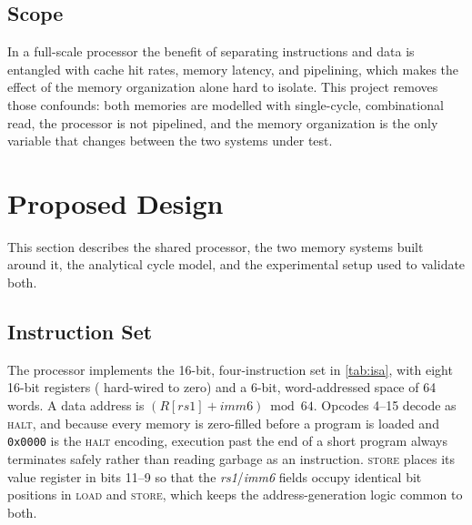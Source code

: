 \documentclass[conference]{IEEEtran}
\newcommand{\sig}[1]{\texttt{\detokenize{#1}}}
\begin{document}
\subsection{Scope}
In a full-scale processor the benefit of separating instructions and data is entangled with cache
hit rates, memory latency, and pipelining, which makes the effect of the memory organization alone
hard to isolate. This project removes those confounds: both memories are modelled with
single-cycle, combinational read, the processor is not pipelined, and the memory organization is
the only variable that changes between the two systems under test.

\section{Proposed Design}
\label{sec:design}

This section describes the shared processor, the two memory systems built around it, the
analytical cycle model, and the experimental setup used to validate both.

\subsection{Instruction Set}
The processor implements the 16-bit, four-instruction set in \cref{tab:isa}, with eight 16-bit
registers (\sig{R0} hard-wired to zero) and a 6-bit, word-addressed space of 64 words. A data
address is $(R[\mathit{rs1}] + \mathit{imm6}) \bmod 64$. Opcodes 4--15 decode as \textsc{halt}, and
because every memory is zero-filled before a program is loaded and \texttt{0x0000} is the
\textsc{halt} encoding, execution past the end of a short program always terminates safely rather
than reading garbage as an instruction. \textsc{store} places its value register in bits 11--9 so
that the \emph{rs1}/\emph{imm6} fields occupy identical bit positions in \textsc{load} and
\textsc{store}, which keeps the address-generation logic common to both.
\end{document}
